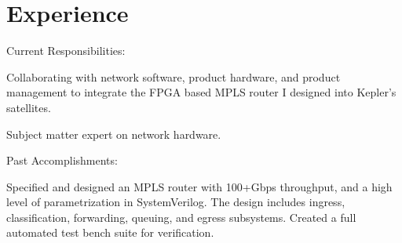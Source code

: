 \documentclass[10pt]{deedy-resume-reversed}
\begin{document}
%
%

%
%

%
%

\begin{minipage}[t]{1.0\textwidth}


\section{Experience}
Current Responsibilities:
\vspace{\topsep} %
\begin{tightemize}
\item Collaborating with network software, product hardware, and product management to integrate
the FPGA based MPLS router I designed into Kepler's satellites.
\item Subject matter expert on network hardware.
\end{tightemize}
Past Accomplishments:
\begin{tightemize}
\item Specified and designed an MPLS router with 100+Gbps throughput, and a high level of parametrization in SystemVerilog.
The design includes ingress, classification, forwarding, queuing, and egress subsystems.
Created a full automated test bench suite for verification.
\end{tightemize}
\sectionsep


\end{minipage}
\end{document}
